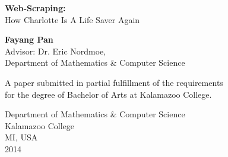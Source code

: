 \documentclass[12pt,twoside,draft]{report}
\begin{document}
\lstset{language=Python,
basicstyle=\ttfamily,
commentstyle=\textit,
breaklines=true,
numbersep=5pt,
xleftmargin=.25in,
xrightmargin=.25in,
columns=fullflexible,
showstringspaces=false}

\begin{titlepage}
    \begin{center}
        \vspace*{3cm}
        \Huge
        \textbf{Web-Scraping:}
        \Large\\
        \vspace{0.1cm}
        How Charlotte Is A Life Saver Again
        
        \vspace{1cm}
        \normalsize
        \textbf{Fayang Pan}\\
        \vspace{1cm}
        Advisor: Dr. Eric Nordmoe, \\Department of Mathematics \& Computer Science
        
        \vfill
        
        A paper submitted in partial fulfillment of the requirements \\for the degree of Bachelor of Arts at Kalamazoo College.
        
        \vspace{0.8cm}
        
        
       	Department of Mathematics \& Computer Science\\
        Kalamazoo College\\
        MI, USA\\
        2014
        
    \end{center}
\end{titlepage}
\newpage
\thispagestyle{empty}
\mbox{}
\end{document}
